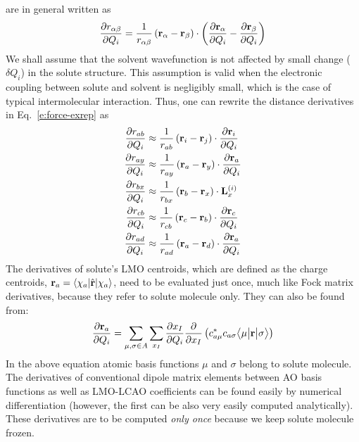 \documentclass[a4paper,titlepage,twoside,fleqn,12pt]{book}
\newcommand{\tbraket}[3]{\ensuremath{\bigl\langle {#1} \bigl\lvert {#2} \bigl\lvert {#3} \bigr\rangle}}
\newcommand{\fderiv}[2]{\ensuremath{
    \frac{\partial #1}{\partial #2}}}
\begin{document}
\begin{refsection}
are in general written as 
%
\begin{equation}\label{e:dr}
\fderiv{r_{\alpha\beta}}{Q_i} = 
\frac{1}{r_{\alpha\beta}} 
\left( {\bf r}_\alpha - {\bf r}_\beta \right) \cdot
\left( \fderiv{{\bf r}_\alpha}{Q_i} - \fderiv{{\bf r}_\beta}{Q_i} \right)
\end{equation}
%
We shall assume that the solvent wavefunction is not affected 
by small change ($\delta Q_i$) in the solute structure. This assumption 
is valid when the electronic coupling between solute and 
solvent is negligibly small, which is the case of typical 
intermolecular interaction. Thus, one can rewrite 
the distance derivatives in Eq.~\eqref{e:force-exrep} as
%
\begin{subequations}
\begin{align}
\fderiv{r_{ab}}{Q_i} &\approx \frac{1}{r_{ab}} 
\left( {\bf r}_i - {\bf r}_j \right) \cdot
\fderiv{{\bf r}_i}{Q_i} \\
\fderiv{r_{ay}}{Q_i} &\approx \frac{1}{r_{ay}} 
\left( {\bf r}_a - {\bf r}_y \right) \cdot
\fderiv{{\bf r}_a}{Q_i} \\
\fderiv{r_{bx}}{Q_i} &\approx \frac{1}{r_{bx}} 
\left( {\bf r}_b - {\bf r}_x \right) \cdot
{\bf L}_x^{(i)} \\
\fderiv{r_{cb}}{Q_i} &\approx \frac{1}{r_{cb}} 
\left( {\bf r}_c - {\bf r}_b \right) \cdot
\fderiv{{\bf r}_c}{Q_i} \\
\fderiv{r_{ad}}{Q_i} &\approx \frac{1}{r_{ad}} 
\left( {\bf r}_a - {\bf r}_d \right) \cdot
\fderiv{{\bf r}_a}{Q_i}
\end{align}
\end{subequations}
%
The derivatives of solute's LMO centroids, which are defined as 
the charge centroids, ${\bf r}_a=\langle \chi_a\lvert\hat{\bf r}\rvert\chi_a\rangle$, 
need to be evaluated just once, 
much like Fock matrix derivatives, because they refer to solute 
molecule only. They can also be found from:
%
\begin{equation}\label{e:ddfg7676s2}
\fderiv{{\bf r}_a}{Q_i} = 
\sum_{\mu,\sigma \in A}\sum_{x_I}
\fderiv{x_I}{Q_i} \fderiv{}{x_I} 
\left( c_{a\mu}^* c_{a\sigma} \tbraket{\mu}{{\bf r}}{\sigma}\right)
\end{equation}
%
In the above equation atomic basis functions $\mu$ and $\sigma$ 
belong to solute molecule. The derivatives of conventional dipole
matrix elements between AO basis functions as well as LMO-LCAO
coefficients can be found easily by numerical differentiation
(however, the first can be also very easily computed analytically).
These derivatives are to be computed \emph{only once} because
we keep solute molecule frozen.%


\end{refsection}
\end{document}

